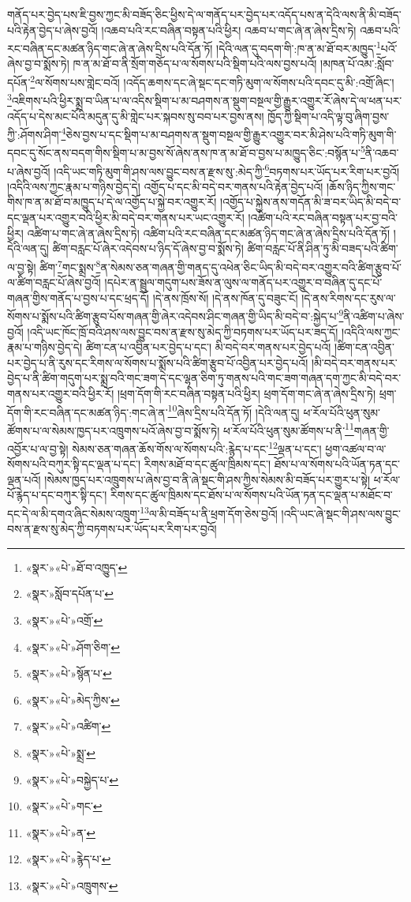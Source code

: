 གནོད་པར་བྱེད་པས་ཇི་བྱས་ཀྱང་མི་བཟོད་ཅིང་ཕྱིས་དེ་ལ་གནོད་པར་བྱེད་པར་འདོད་པས་ན་དེའི་ལས་ནི་མི་བཟོད་པའི་རྟེན་བྱེད་པ་ཞེས་བྱའོ། །འཆབ་པའི་རང་བཞིན་བསྟན་པའི་ཕྱིར། འཆབ་པ་གང་ཞེ་ན་ཞེས་དྲིས་ཏེ། འཆབ་པའི་རང་བཞིན་དང་མཚན་ཉིད་གང་ཞེ་ན་ཞེས་དྲིས་པའི་དོན་ཏོ། །དེའི་ལན་དུ་བདག་གི་:ཁ་ན་མ་ཐོ་བར་མཁྱུད་\footnote{«སྣར་»«པེ་»ཐོ་བ་འཁྱུད་}པའོ་ཞེས་བྱ་བ་སྨོས་ཏེ། ཁ་ན་མ་ཐོ་བ་ནི་སྲོག་གཅོད་པ་ལ་སོགས་པའི་སྡིག་པའི་ལས་བྱས་པའོ། །མཁན་པོ་འམ་:སློབ་དཔོན་\footnote{«སྣར་»སློབ་དཔོན་པ་}ལ་སོགས་པས་གླེང་བའོ། །འདོད་ཆགས་དང་ཞེ་སྡང་དང་གཏི་མུག་ལ་སོགས་པའི་དབང་དུ་མི་:འགྲོ་ཞིང་། \footnote{«སྣར་»«པེ་»འགྲོ་}འཇིགས་པའི་ཕྱིར་སྨྲ་བ་ཡིན་པ་ལ་འདིས་སྡིག་པ་མ་བཤགས་ན་སྡུག་བསྔལ་གྱི་རྒྱུར་འགྱུར་རོ་ཞེས་དེ་ལ་ཕན་པར་འདོད་པ་དེས་མང་པོའི་མདུན་དུ་མི་གླེང་པར་སྐབས་སུ་བབ་པར་བྱས་ནས། ཁྱོད་ཀྱི་སྡིག་པ་འདི་ལྟ་བུ་ཞིག་བྱས་ཀྱི་:ཤོགས་ཤིག་\footnote{«སྣར་»«པེ་»ཤོག་ཅིག་}ཅེས་བྱས་པ་དང་སྡིག་པ་མ་བཤགས་ན་སྡུག་བསྔལ་གྱི་རྒྱུར་འགྱུར་བར་མི་ཤེས་པའི་གཏི་མུག་གི་དབང་དུ་སོང་ནས་བདག་གིས་སྡིག་པ་མ་བྱས་སོ་ཞེས་ནས་ཁ་ན་མ་ཐོ་བ་བྱས་པ་མཁྱུད་ཅིང་:བསྙོན་པ་\footnote{«སྣར་»«པེ་»སྙོན་པ་}ནི་འཆབ་པ་ཞེས་བྱའོ། །འདི་ཡང་གཏི་མུག་གི་ཤས་ལས་བྱུང་བས་ན་རྫས་སུ་:མེད་ཀྱི་\footnote{«སྣར་»«པེ་»མེད་ཀྱིས་}བཏགས་པར་ཡོད་པར་རིག་པར་བྱའོ། །འདིའི་ལས་ཀྱང་རྣམ་པ་གཉིས་བྱེད་དེ། འགྱོད་པ་དང་མི་བདེ་བར་གནས་པའི་རྟེན་བྱེད་པའོ། །ཆོས་ཉིད་ཀྱིས་གང་གིས་ཁ་ན་མ་ཐོ་བ་མཁྱུད་པ་དེ་ལ་འགྱོད་པ་སྐྱེ་བར་འགྱུར་རོ། །འགྱོད་པ་སྐྱེས་ནས་གདོན་མི་ཟ་བར་ཡིད་མི་བདེ་བ་དང་ལྡན་པར་འགྱུར་བའི་ཕྱིར་མི་བདེ་བར་གནས་པར་ཡང་འགྱུར་རོ། །འཚིག་པའི་རང་བཞིན་བསྟན་པར་བྱ་བའི་ཕྱིར། འཚིག་པ་གང་ཞེ་ན་ཞེས་དྲིས་ཏེ། འཚིག་པའི་རང་བཞིན་དང་མཚན་ཉིད་གང་ཞེ་ན་ཞེས་དྲིས་པའི་དོན་ཏོ། །དེའི་ལན་དུ། ཚིག་བརླང་པོ་ཞེར་འདེབས་པ་ཉིད་དོ་ཞེས་བྱ་བ་སྨོས་ཏེ། ཚིག་བརླང་པོ་ནི་ཤིན་ཏུ་མི་བཟད་པའི་ཚིག་ལ་བྱ་སྟེ། ཚིག་\footnote{«སྣར་»«པེ་»འཚིག་}གང་སྨྲས་\footnote{«སྣར་»«པེ་»སྨྲ་}ན་སེམས་ཅན་གཞན་གྱི་གནད་དུ་འཕེན་ཅིང་ཡིད་མི་བདེ་བར་འགྱུར་བའི་ཚིག་རྩུབ་པོ་ལ་ཚིག་བརླང་པོ་ཞེས་བྱའོ། །དཔེར་ན་སྦྲུལ་གདུག་པས་ཟོས་ན་ལུས་ལ་གནོད་པར་འགྱུར་བ་བཞིན་དུ་དང་པོ་གཞན་གྱིས་གནོད་པ་བྱས་པ་དང་ཕྲད་དོ། །དེ་ནས་ཁྲོས་སོ། །དེ་ནས་ཁོན་དུ་བཟུང་ངོ། །དེ་ནས་རིགས་དང་རུས་ལ་སོགས་པ་སྨོས་པའི་ཚིག་རྩུབ་པོས་གཞན་གྱི་ཞེར་འདེབས་ཤིང་གཞན་གྱི་ཡིད་མི་བདེ་བ་:སྐྱེད་པ་\footnote{«སྣར་»«པེ་»བསྐྱེད་པ་}ནི་འཚིག་པ་ཞེས་བྱའོ། །འདི་ཡང་ཁོང་ཁྲོ་བའི་ཤས་ལས་བྱུང་བས་ན་རྫས་སུ་མེད་ཀྱི་བཏགས་པར་ཡོད་པར་ཟད་དོ། །འདིའི་ལས་ཀྱང་རྣམ་པ་གཉིས་བྱེད་དེ། ཚིག་ངན་པ་འབྱིན་པར་བྱེད་པ་དང་། མི་བདེ་བར་གནས་པར་བྱེད་པའོ། །ཚིག་ངན་འབྱིན་པར་བྱེད་པ་ནི་རུས་དང་རིགས་ལ་སོགས་པ་སྨོས་པའི་ཚིག་རྩུབ་པོ་འབྱིན་པར་བྱེད་པའོ། །མི་བདེ་བར་གནས་པར་བྱེད་པ་ནི་ཚིག་གདུག་པར་སྨྲ་བའི་གང་ཟག་དེ་དང་ལྷན་ཅིག་ཏུ་གནས་པའི་གང་ཟག་གཞན་དག་ཀྱང་མི་བདེ་བར་གནས་པར་འགྱུར་བའི་ཕྱིར་རོ། །ཕྲག་དོག་གི་རང་བཞིན་བསྟན་པའི་ཕྱིར། ཕྲག་དོག་གང་ཞེ་ན་ཞེས་དྲིས་ཏེ། ཕྲག་དོག་གི་རང་བཞིན་དང་མཚན་ཉིད་:གང་ཞེ་ན་\footnote{«སྣར་»«པེ་»གང་}ཞེས་དྲིས་པའི་དོན་ཏོ། །དེའི་ལན་དུ། ཕ་རོལ་པོའི་ཕུན་སུམ་ཚོགས་པ་ལ་སེམས་ཁྱད་པར་འཁྲུགས་པའོ་ཞེས་བྱ་བ་སྨོས་ཏེ། ཕ་རོལ་པོའི་ཕུན་སུམ་ཚོགས་པ་ནི་\footnote{«སྣར་»«པེ་»ན་}གཞན་གྱི་འབྱོར་པ་ལ་བྱ་སྟེ། སེམས་ཅན་གཞན་ཆོས་གོས་ལ་སོགས་པའི་:རྙེད་པ་དང་\footnote{«སྣར་»«པེ་»རྙེད་པ་}ལྡན་པ་དང་། ཕྱག་འཚལ་བ་ལ་སོགས་པའི་བཀུར་སྟི་དང་ལྡན་པ་དང་། རིགས་མཐོ་བ་དང་ཚུལ་ཁྲིམས་དང་། ཐོས་པ་ལ་སོགས་པའི་ཡོན་ཏན་དང་ལྡན་པའོ། །སེམས་ཁྱད་པར་འཁྲུགས་པ་ཞེས་བྱ་བ་ནི་ཞེ་སྡང་གི་ཤས་ཀྱིས་སེམས་མི་བཟོད་པར་གྱུར་པ་སྟེ། ཕ་རོལ་པོ་རྙེད་པ་དང་བཀུར་སྟི་དང་། རིགས་དང་ཚུལ་ཁྲིམས་དང་ཐོས་པ་ལ་སོགས་པའི་ཡོན་ཏན་དང་ལྡན་པ་མཐོང་བ་དང་དེ་ལ་མི་དགའ་ཞིང་སེམས་འཁྲུག་\footnote{«སྣར་»«པེ་»འཁྲུགས་}ལ་མི་བཟོད་པ་ནི་ཕྲག་དོག་ཅེས་བྱའོ། །འདི་ཡང་ཞེ་སྡང་གི་ཤས་ལས་བྱུང་བས་ན་རྫས་སུ་མེད་ཀྱི་བཏགས་པར་ཡོད་པར་རིག་པར་བྱའོ། 